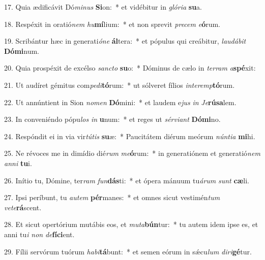 17. Quia ædificávit Dó\textit{mi}\textit{nus} \textbf{Si}on:~*  et vidébitur in \textit{gló}\textit{ri}\textit{a} \textbf{su}a.\

18. Respéxit in oratió\textit{nem} \textit{hu}\textbf{mí}lium:~*  et non sprevit \textit{pre}\textit{cem} \textit{e}\textbf{ó}rum.\

19. Scribántur hæc in generati\textit{ó}\textit{ne} \textbf{ál}tera:~*  et pópulus qui creábitur, \textit{lau}\textit{dá}\textit{bit} \textbf{Dó}\textbf{mi}num.\

20. Quia prospéxit de excélso \textit{sanc}\textit{to} \textbf{su}o:~*  Dóminus de cælo in \textit{ter}\textit{ram} \textit{a}\textbf{spé}xit:\

21. Ut audíret gémitus com\textit{pe}\textit{di}\textbf{tó}rum:~*  ut sólveret fílios \textit{in}\textit{ter}\textit{emp}\textbf{tó}rum.\

22. Ut annúntient in Sion \textit{no}\textit{men} \textbf{Dó}mini:~*  et laudem e\textit{jus} \textit{in} \textit{Je}\textbf{rú}\textbf{sa}lem.\

23. In conveniéndo pópu\textit{los} \textit{in} \textbf{u}num:~*  et reges ut \textit{sér}\textit{vi}\textit{ant} \textbf{Dó}\textbf{mi}no.\

24. Respóndit ei in via vir\textit{tú}\textit{tis} \textbf{su}æ:~*  Paucitátem diérum meórum \textit{nún}\textit{ti}\textit{a} \textbf{mi}hi.\

25. Ne révoces me in dimídio dié\textit{rum} \textit{me}\textbf{ó}rum:~*  in generatiónem et generatió\textit{nem} \textit{an}\textit{ni} \textbf{tu}i.\

26. Inítio tu, Dómine, ter\textit{ram} \textit{fun}\textbf{dás}ti:~*  et ópera mánuum tu\textit{á}\textit{rum} \textit{sunt} \textbf{cæ}li.\

27. Ipsi períbunt, tu \textit{au}\textit{tem} \textbf{pér}manes:~*  et omnes sicut vestimén\textit{tum} \textit{ve}\textit{te}\textbf{rá}scent.\

28. Et sicut opertórium mutábis eos, et \textit{mu}\textit{ta}\textbf{bún}tur:~*  tu autem idem ipse es, et anni tu\textit{i} \textit{non} \textit{de}\textbf{fí}\textbf{ci}ent.\

29. Fílii servórum tuórum \textit{ha}\textit{bi}\textbf{tá}bunt:~*  et semen eórum in sǽcu\textit{lum} \textit{di}\textit{ri}\textbf{gé}tur.\

